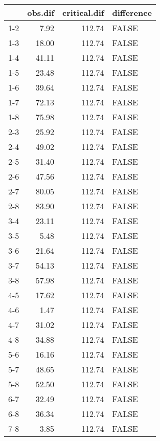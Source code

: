 \begin{table}[ht]
\centering
\begin{tabular}{rrrl}
  \hline
 & obs.dif & critical.dif & difference \\ 
  \hline
1-2 & 7.92 & 112.74 & FALSE \\ 
  1-3 & 18.00 & 112.74 & FALSE \\ 
  1-4 & 41.11 & 112.74 & FALSE \\ 
  1-5 & 23.48 & 112.74 & FALSE \\ 
  1-6 & 39.64 & 112.74 & FALSE \\ 
  1-7 & 72.13 & 112.74 & FALSE \\ 
  1-8 & 75.98 & 112.74 & FALSE \\ 
  2-3 & 25.92 & 112.74 & FALSE \\ 
  2-4 & 49.02 & 112.74 & FALSE \\ 
  2-5 & 31.40 & 112.74 & FALSE \\ 
  2-6 & 47.56 & 112.74 & FALSE \\ 
  2-7 & 80.05 & 112.74 & FALSE \\ 
  2-8 & 83.90 & 112.74 & FALSE \\ 
  3-4 & 23.11 & 112.74 & FALSE \\ 
  3-5 & 5.48 & 112.74 & FALSE \\ 
  3-6 & 21.64 & 112.74 & FALSE \\ 
  3-7 & 54.13 & 112.74 & FALSE \\ 
  3-8 & 57.98 & 112.74 & FALSE \\ 
  4-5 & 17.62 & 112.74 & FALSE \\ 
  4-6 & 1.47 & 112.74 & FALSE \\ 
  4-7 & 31.02 & 112.74 & FALSE \\ 
  4-8 & 34.88 & 112.74 & FALSE \\ 
  5-6 & 16.16 & 112.74 & FALSE \\ 
  5-7 & 48.65 & 112.74 & FALSE \\ 
  5-8 & 52.50 & 112.74 & FALSE \\ 
  6-7 & 32.49 & 112.74 & FALSE \\ 
  6-8 & 36.34 & 112.74 & FALSE \\ 
  7-8 & 3.85 & 112.74 & FALSE \\ 
   \hline
\end{tabular}
\end{table}
